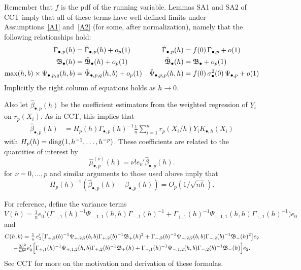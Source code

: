 \documentclass[12pt,fleqn]{article}
\begin{document}
Remember that $f$ is the pdf of the running variable. Lemmas
SA1 and SA2 of CCT imply that all of these terms have well-defined limits under
Assumptions~\ref{A1} and~\ref{A2} (for some, after normalization), namely that
the following relationships hold:
\begin{align}
  \Gamma_{\bullet,p}(h) & = \tilde{\Gamma}_{\bullet,p}(h) + o_p(1) &
  \tilde{\Gamma}_{\bullet,p}(h) &= f(0) \, \Gamma_{\bullet,p} + o(1) \label{eq:10} \\
  \mathfrak{B}_{\bullet}(h) &= \tilde{\mathfrak{B}}_{\bullet}(h) + o_p(1) &
  \tilde{\mathfrak{B}}_{\bullet}(h) &= \mathfrak{B}_{\bullet} + o_p(1) \label{eq:11} \\
  \max(h,b) \times \Psi_{\bullet,p,q}(h, b) &= \tilde{\Psi}_{\bullet,p,q}(h,b) + o_p(1) &
  \tilde{\Psi}_{\bullet,p,p}(h,h) &= f(0) \, \sigma^2_{\bullet}(0) \, \Psi_{\bullet,p} + o(1) \label{eq:12}
\end{align}
Implicitly the right column of equations holds as $h \to 0$.

Also let $\hat\beta_{\bullet,p}(h)$ be the coefficient
estimators from the weighted regression of $Y_i$ on $r_p(X_i)$. As in CCT, this
implies that
\begin{align*}
  \hat\beta_{\bullet,p}(h) &= H_p(h) \Gamma_{\bullet,p}(h)^{-1}
  \tfrac{1}{n} \sum_{i=1}^n r_p(X_i/h) Y_i K_{\bullet,h}(X_i)
\end{align*}
with $H_p(h) = \operatorname{diag}(1, h^{-1}, \dots, h^{-p})$.
These coefficients are related to the quantities of interest by
\begin{equation*}
  \hat{\mu}_{\bullet,p}^{(\nu)}(h) = \nu! e_\nu' \hat\beta_{\bullet,p}(h).
\end{equation*}
for $\nu = 0,\dots,p$ and similar arguments to those used above imply that
\begin{equation*}
  H_p(h)^{-1}(\hat\beta_{\bullet,p}(h) - \beta_{\bullet,p}(h))= O_p(1/\sqrt{nh}).
\end{equation*}

For reference, define the variance terms
\begin{equation*}
  V(h)
  = \tfrac{1}{n} e_0' \big(\Gamma_{-,1}(h)^{-1} \Psi_{-,1,1}(h,h)
    \Gamma_{-,1}(h)^{-1}
  + \Gamma_{+,1}(h)^{-1} \Psi_{+,1,1}(h,h) \Gamma_{+,1}(h)^{-1} \big) e_0
\end{equation*}
and
\begin{multline*}
  C(h,b) =
  \tfrac{1}{n} \, e_2' \big[
    \Gamma_{+,2}(b)^{-1} \Psi_{+,2,2}(b,b) \Gamma_{+,2}(b)^{-1} \mathfrak{B}_+(h)^2 +
    \Gamma_{-,2}(b)^{-1} \Psi_{-,2,2}(b,b) \Gamma_{-,2}(b)^{-1} \mathfrak{B}_-(h)^2
  \big] e_2 \\
  - \tfrac{2 h^2}{n b^{2}}
    e_0' \Big[
    \Gamma_{+,1}(h)^{-1} \Psi_{+,1,2}(h,b) \Gamma_{+,2}(b)^{-1} \mathfrak{B}_+(h) +
    \Gamma_{-,1}(h)^{-1} \Psi_{-,1,2}(h,b) \Gamma_{-,2}(b)^{-1} \mathfrak{B}_-(h)
    \Big] e_2.
\end{multline*}
See CCT for more on the motivation and derivation of these formulas.
\end{document}
